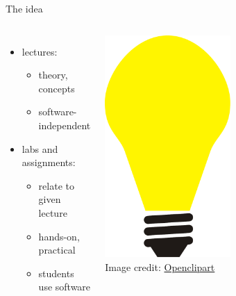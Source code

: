 \documentclass[xcolor={dvipsnames,usenames},beamer]{beamer}
\begin{document}
\begin{frame}{The idea}

\begin{columns}[c]


\begin{itemize}
 \item lectures:
 \begin{itemize}
  \item theory, concepts
  \item software-independent
 \end{itemize}
 \item labs and assignments:
 \begin{itemize}
  \item relate to given lecture
  \item hands-on, practical
  \item students use software
 \end{itemize}
\end{itemize}


\bigskip

\centering
\includegraphics[width=0.5\textwidth]{./images/general/bulp}%
\\
\tiny
\color{gray}
Image credit: \href{https://openclipart.org}{Openclipart}

\end{columns}

\end{frame}
\end{document}
